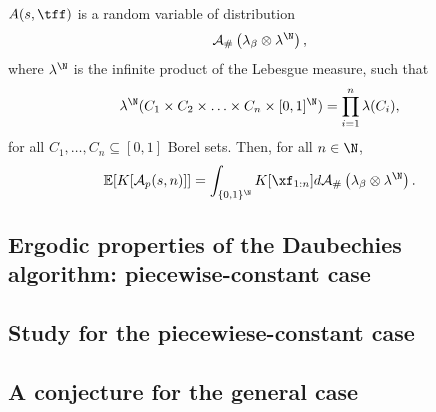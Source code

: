 $A(s,\tff)$ is a random variable of distribution
\begin{equation}
    \mathcal A_{\#} \left(\lambda_\beta \otimes\lambda^\N\right),
\end{equation}
where $\lambda^\N$ is the infinite product of the Lebesgue measure, such that 
\begin{equation}
    \lambda^\N(C_1\times C_2 \times \ldots \times C_n \times [0,1]^\N) = \prod_{i=1}^n \lambda(C_i),
\end{equation}
for all $C_1, \ldots, C_n \subseteq [0,1]$ Borel sets. Then, for all $n \in \N$, 
\begin{equation}
    \mathbb E[K[\mathcal A_p(s, n)]] = \int_{\{0,1\}^\N}  K[\xf_{1:n}] d\mathcal A_{\#}\left(\lambda_\beta \otimes\lambda^\N\right).
\end{equation}



\subsection{Ergodic properties of the Daubechies algorithm: piecewise-constant case}

\subsection{Study for the piecewiese-constant case}

\subsection{A conjecture for the general case}

